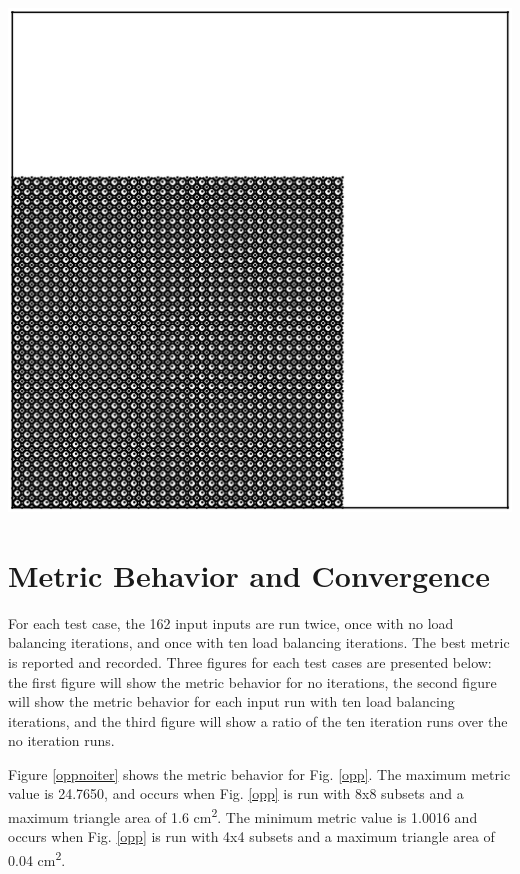 \noindent\begin{minipage}{\textwidth}
\centering
\includegraphics[scale = 0.5]{figures/lattice-12-shifted.eps}
\label{lattice}
\end{minipage}

\section{Metric Behavior and Convergence}

For each test case, the 162 input inputs are run twice, once with no load balancing iterations, and once with ten load balancing iterations. The best metric is reported and recorded. Three figures for each test cases are presented below: the first figure will show the metric behavior for no iterations, the second figure will show the metric behavior for each input run with ten load balancing iterations, and the third figure will show a ratio of the ten iteration runs over the no iteration runs.

Figure \ref{oppnoiter} shows the metric behavior for Fig. \ref{opp}. The maximum metric value is 24.7650, and occurs when Fig. \ref{opp} is run with 8x8 subsets and a maximum triangle area of 1.6 cm\textsuperscript{2}. The minimum metric value is 1.0016 and occurs when Fig. \ref{opp} is run with 4x4 subsets and a maximum triangle area of 0.04 cm\textsuperscript{2}. 

